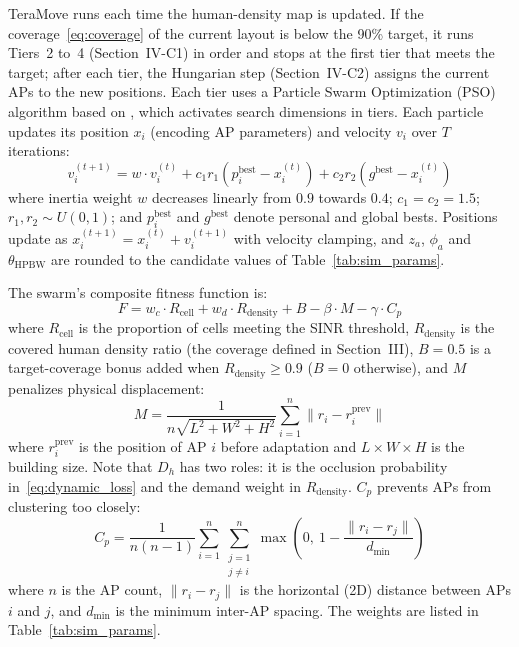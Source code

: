 \documentclass[conference]{IEEEtran}
\begin{document}
	TeraMove runs each time the human-density map is updated. If the coverage~\eqref{eq:coverage} of the current layout is below the 90\% target, it runs Tiers~2 to~4 (Section~IV-C1) in order and stops at the first tier that meets the target; after each tier, the Hungarian step (Section~IV-C2) assigns the current APs to the new positions. Each tier uses a Particle Swarm Optimization (PSO)
	algorithm based on \cite{b11,b13}, which activates search dimensions in
	tiers. Each particle updates its position $x_i$ (encoding AP parameters)
	and velocity $v_i$ over $T$ iterations:
	\begin{equation}
		v_i^{(t+1)} = w \cdot v_i^{(t)} + c_1 r_1 (p_i^{\text{best}} -
		x_i^{(t)}) + c_2 r_2 (g^{\text{best}} - x_i^{(t)})
		\label{eq:pso_velocity}
	\end{equation}
	where inertia weight $w$ decreases linearly from $0.9$ towards $0.4$; $c_1 = c_2
	= 1.5$; $r_1, r_2 \sim U(0,1)$; and $p_i^{\text{best}}$ and
	$g^{\text{best}}$ denote personal and global bests. Positions update as
	$x_i^{(t+1)} = x_i^{(t)} + v_i^{(t+1)}$ with velocity clamping, and $z_a$, $\phi_a$ and $\theta_{\text{HPBW}}$ are rounded to the candidate values of Table~\ref{tab:sim_params}.

	The swarm's composite fitness function is:
	\begin{equation}
		F = w_c \cdot R_{\text{cell}} + w_d \cdot R_{\text{density}} + B -
		\beta \cdot M - \gamma \cdot C_p
		\label{eq:fitness}
	\end{equation}
	where $R_{\text{cell}}$ is the proportion of cells meeting the SINR
	threshold, $R_{\text{density}}$ is the covered human density ratio (the coverage defined in Section~III), $B = 0.5$ is
	a target-coverage bonus added when $R_{\text{density}} \ge 0.9$ ($B = 0$ otherwise), and $M$ penalizes physical displacement:
	\begin{equation}
		M = \frac{1}{n\sqrt{L^2 + W^2 + H^2}} \sum_{i=1}^{n} \|r_i - r_i^{\text{prev}}\|
		\label{eq:movement}
	\end{equation}
	where $r_i^{\text{prev}}$ is the position of AP $i$ before adaptation and $L \times W \times H$ is the building size. Note that $D_h$ has two roles: it is the occlusion probability in~\eqref{eq:dynamic_loss} and the demand weight in $R_{\text{density}}$. $C_p$
	prevents APs from clustering too closely:
	\begin{equation}
		C_p = \frac{1}{n(n-1)} \sum_{i=1}^{n}\sum_{\substack{j=1 \\ j \ne
				i}}^{n} \max\left(0,\ 1 - \frac{\|r_i - r_j\|}{d_{\min}}\right)
		\label{eq:clustering_penalty}
	\end{equation}
	where $n$ is the AP count, $\|r_i - r_j\|$ is the horizontal (2D) distance between APs $i$ and $j$, and $d_{\min}$ is
	the minimum inter-AP spacing. The weights are listed in Table~\ref{tab:sim_params}.
\end{document}
